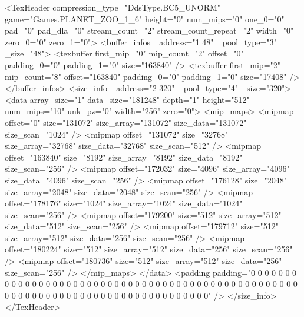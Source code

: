 <TexHeader compression_type="DdsType.BC5_UNORM" game="Games.PLANET_ZOO_1_6" height="0" num_mips="0" one_0="0" pad="0" pad_dla="0" stream_count="2" stream_count_repeat="2" width="0" zero_0="0" zero_1="0">
	<buffer_infos _address="1 48" _pool_type="3" _size="48">
		<texbuffer first_mip="0" mip_count="2" offset="0" padding_0="0" padding_1="0" size="163840" />
		<texbuffer first_mip="2" mip_count="8" offset="163840" padding_0="0" padding_1="0" size="17408" />
	</buffer_infos>
	<size_info _address="2 320" _pool_type="4" _size="320">
		<data array_size="1" data_size="181248" depth="1" height="512" num_mips="10" unk_pz="0" width="256" zero="0">
			<mip_maps>
				<mipmap offset="0" size="131072" size_array="131072" size_data="131072" size_scan="1024" />
				<mipmap offset="131072" size="32768" size_array="32768" size_data="32768" size_scan="512" />
				<mipmap offset="163840" size="8192" size_array="8192" size_data="8192" size_scan="256" />
				<mipmap offset="172032" size="4096" size_array="4096" size_data="4096" size_scan="256" />
				<mipmap offset="176128" size="2048" size_array="2048" size_data="2048" size_scan="256" />
				<mipmap offset="178176" size="1024" size_array="1024" size_data="1024" size_scan="256" />
				<mipmap offset="179200" size="512" size_array="512" size_data="512" size_scan="256" />
				<mipmap offset="179712" size="512" size_array="512" size_data="256" size_scan="256" />
				<mipmap offset="180224" size="512" size_array="512" size_data="256" size_scan="256" />
				<mipmap offset="180736" size="512" size_array="512" size_data="256" size_scan="256" />
			</mip_maps>
		</data>
		<padding padding="0 0 0 0 0 0 0 0 0 0 0 0 0 0 0 0 0 0 0 0 0 0 0 0 0 0 0 0 0 0 0 0 0 0 0 0 0 0 0 0 0 0 0 0 0 0 0 0 0 0 0 0 0 0 0 0 0 0 0 0 0 0 0 0 0 0 0 0 0 0 0 0 0 0 0 0 0 0 0 0" />
	</size_info>
</TexHeader>
